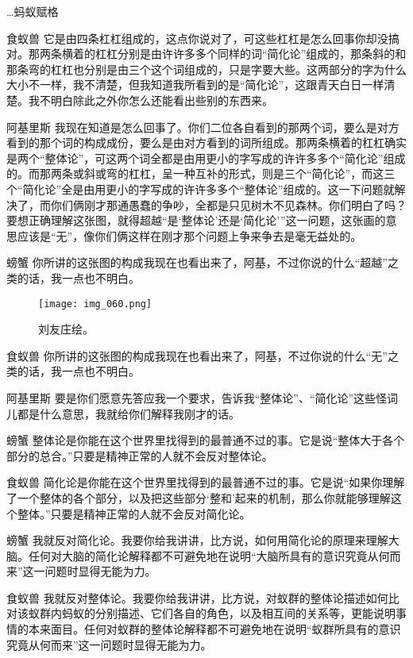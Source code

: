 \begin{dialog}{…蚂蚁赋格}
\begin{dialogue}
\item[食蚁兽]它是由四条杠杠组成的，这点你说对了，可这些杠杠是怎么回事你却没搞对。那两条横着的杠杠分别是由许许多多个同样的词“简化论”组成的，那条斜的和那条弯的杠杠也分别是由三个这个词组成的，只是字要大些。这两部分的字为什么大小不一样，我不清楚，但我知道我所看到的是“简化论”，这跟青天白日一样清楚。我不明白除此之外你怎么还能看出些别的东西来。

\item[阿基里斯]我现在知道是怎么回事了。你们二位各自看到的那两个词，要么是对方看到的那个词的构成成份，要么是由对方看到的词所组成。那两条横着的杠杠确实是两个“整体论”，可这两个词全都是由用更小的字写成的许许多多个“简化论”组成的。而那两条或斜或弯的杠杠，呈一种互补的形式，则是三个“简化论”，而这三个“简化论”全是由用更小的字写成的许许多多个“整体论”组成的。这一下问题就解决了，而你们俩刚才那通愚蠢的争吵，全都是只见树木不见森林。你们明白了吗？要想正确理解这张图，就得超越“是‘整体论’还是‘简化论’”这一问题，这张画的意思应该是“无”，像你们俩这样在刚才那个问题上争来争去是毫无益处的。

\item[螃蟹]你所讲的这张图的构成我现在也看出来了，阿基，不过你说的什么“超越”之类的话，我一点也不明白。

\begin{figure}
\texttt{[image: img\_060.png]}
\caption[“无之图”]
  {刘友庄绘。}
\end{figure}

\item[食蚁兽]你所讲的这张图的构成我现在也看出来了，阿基，不过你说的什么“无”之类的话，我一点也不明白。

\item[阿基里斯]要是你们愿意先答应我一个要求，告诉我“整体论”、“简化论”这些怪词儿都是什么意思，我就给你们解释我刚才的话。

\item[螃蟹]整体论是你能在这个世界里找得到的最普通不过的事。它是说“整体大于各个部分的总合。”只要是精神正常的人就不会反对整体论。

\item[食蚁兽]简化论是你能在这个世界里找得到的最普通不过的事。它是说“如果你理解了一个整体的各个部分，以及把这些部分‘整和’起来的机制，那么你就能够理解这个整体。”只要是精神正常的人就不会反对简化论。

\item[螃蟹]我就反对简化论。我要你给我讲讲，比方说，如何用简化论的原理来理解大脑。任何对大脑的简化论解释都不可避免地在说明“大脑所具有的意识究竟从何而来”这一问题时显得无能为力。

\item[食蚁兽]我就反对整体论。我要你给我讲讲，比方说，对蚁群的整体论描述如何比对该蚁群内蚂蚁的分别描述、它们各自的角色，以及相互间的关系等，更能说明事情的本来面目。任何对蚁群的整体论解释都不可避免地在说明“蚁群所具有的意识究竟从何而来”这一问题时显得无能为力。


\end{dialogue}
\end{dialog}
